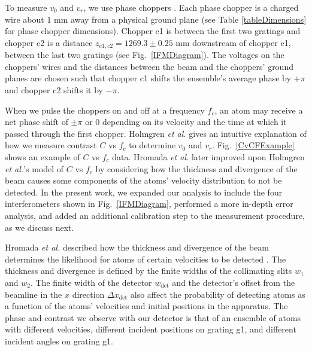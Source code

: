 \documentclass[twocolumn,pra,showpacs,superscriptaddress,longbibliography]{revtex4-1}   %
\newcommand{\figref}[1]{Fig.~\ref{#1}}
\newcommand{\etal}{\textit{et al.}}
\newcommand{\etalspace}{\textit{et al. }}
\begin{document}
To measure $v_0$ and $v_r$, we use phase choppers \cite{Holmgren2011,Hromada2014}. Each phase chopper is a charged wire about 1 mm away from a physical ground plane (see Table \ref{tableDimensions} for phase chopper dimensions). Chopper c1 is between the first two gratings and chopper c2 is a distance $z_{c1,c2} = 1269.3 \pm 0.25$ mm downstream of chopper c1, between the last two gratings (see \figref{IFMDiagram}). The voltages on the choppers' wires and the distances between the beam and the choppers' ground planes are chosen such that chopper c1 shifts the ensemble's average phase by $+\pi$ and chopper c2 shifts it by $-\pi$. 

When we pulse the choppers on and off at a frequency $f_c$, an atom may receive a net phase shift of $\pm\pi$ or $0$ depending on its velocity and the time at which it passed through the first chopper. 
Holmgren \etalspace \cite{Holmgren2011} gives an intuitive explanation of how
we measure contrast $C$ vs $f_c$ to determine $v_0$ and $v_r$. \figref{CvCFExample} shows an example of $C$ vs $f_c$ data. Hromada \etalspace \cite{Hromada2014} later improved upon Holmgren \etal's model of $C$ vs $f_c$ by considering how the thickness and divergence of the beam causes some components of the atoms' velocity distribution to not be detected. In the present work,
we expanded our analysis to include the four interferometers shown in \figref{IFMDiagram}, performed a more in-depth error analysis,
and added an additional calibration step to the measurement procedure, as we discuss next.



Hromada \etalspace described how the thickness and divergence of the beam determines the likelihood for atoms of certain velocities to be detected \cite{Hromada2014}.
The thickness and divergence is defined by the finite widths of the collimating slits $w_1$ and $w_2$. The finite width of the detector $w_{\mathrm{det}}$ and the detector's offset from the beamline in the $x$ direction $\Delta x_{\mathrm{det}}$ also 
affect the probability of detecting atoms as a function of the atoms' velocities and initial positions in the apparatus.
The phase and contrast we observe with our detector is that of an ensemble of atoms with different velocities, different incident positions on grating g1, and different incident angles on grating g1.
\end{document}
